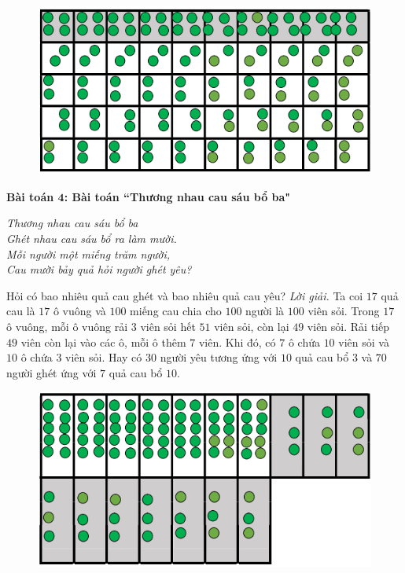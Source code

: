 \begin{multicols}{2}
	\begin{figure}[H]
		\vspace*{-5pt}
		\centering
		\captionsetup{labelformat= empty, justification=centering}
		\includegraphics[width= 1\linewidth]{3}
		\vspace*{-15pt}
	\end{figure}
	\textbf{\color{diendantoanhoc}Bài toán $\pmb4$: Bài toán ``Thương nhau cau sáu bổ ba"}
	\begin{center}
		\textit{Thương nhau cau sáu bổ ba\\
		Ghét nhau cau sáu bổ ra làm mười.\\
		Mỗi người một miếng trăm người,\\
		Cau mười bảy quả hỏi người ghét yêu?}
	\end{center}
	Hỏi có bao nhiêu quả cau ghét và bao nhiêu quả cau yêu?
	\vskip 0.1cm
	\textit{Lời giải.}
	Ta coi $17$ quả cau là $17$ ô vuông và $100$ miếng cau chia cho $100$ người là $100$ viên sỏi. Trong $17$ ô vuông, mỗi ô vuông rải $3$ viên sỏi hết $51$ viên sỏi, còn lại $49$ viên sỏi. Rải tiếp $49$ viên còn lại vào các ô, mỗi ô thêm $7$ viên. Khi đó, có $7$ ô chứa $10$ viên sỏi và $10$ ô chứa $3$ viên sỏi. Hay có $30$ người yêu tương ứng với $10$ quả cau bổ $3$ và $70$ người ghét ứng với $7$ quả cau bổ $10$.
	\begin{figure}[H]
		\vspace*{-5pt}
		\centering
		\captionsetup{labelformat= empty, justification=centering}
		\includegraphics[width= 1\linewidth]{4}

\end{figure}
\end{multicols}
